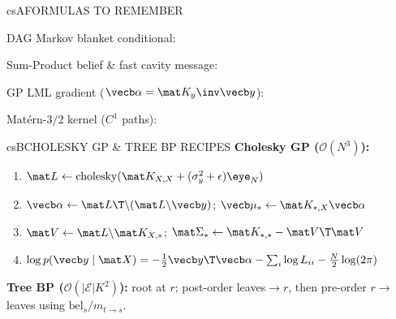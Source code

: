 \documentclass[../../../../master.tex]{subfiles}
\begin{document}
\begin{cscolumns}
\begin{cscard}{csA}{FORMULAS TO REMEMBER}
  \begin{csbul}
    \item DAG Markov blanket conditional:
    \item Sum-Product belief \& fast cavity message:
    \item GP LML gradient ($\vecb\alpha=\mat K_y\inv\vecb y$):
    \item Mat\'ern-$3/2$ kernel ($C^1$ paths):
  \end{csbul}
\end{cscard}

\begin{cscard}{csB}{CHOLESKY GP \& TREE BP RECIPES}
  \textbf{Cholesky GP ($\mathcal O(N^3)$):}
  \begin{enumerate}[leftmargin=1.2em, itemsep=0.5pt, topsep=0.5pt, parsep=0pt]
    \item $\mat L\gets\mathrm{cholesky}(\mat K_{X,X}+(\sigma_y^2+\epsilon)\eye_N)$
    \item $\vecb\alpha\gets\mat L\T\backslash(\mat L\backslash\vecb y)$;\; $\vecb\mu_*\gets\mat K_{*,X}\vecb\alpha$
    \item $\mat V\gets\mat L\backslash\mat K_{X,*}$;\; $\mat\Sigma_*\gets\mat K_{*,*}-\mat V\T\mat V$
    \item $\log p(\vecb y\mid\mat X) = -\tfrac{1}{2}\vecb y\T\vecb\alpha - \sum_i\log L_{ii} - \tfrac{N}{2}\log(2\pi)$
  \end{enumerate}
  \textbf{Tree BP ($\mathcal O(|\mathcal E|K^2)$):} root at $r$; post-order leaves$\to r$, then pre-order $r\to$leaves using $\mathrm{bel}_s/m_{t\to s}$.
\end{cscard}
\columnbreak


\end{cscolumns}
\end{document}

